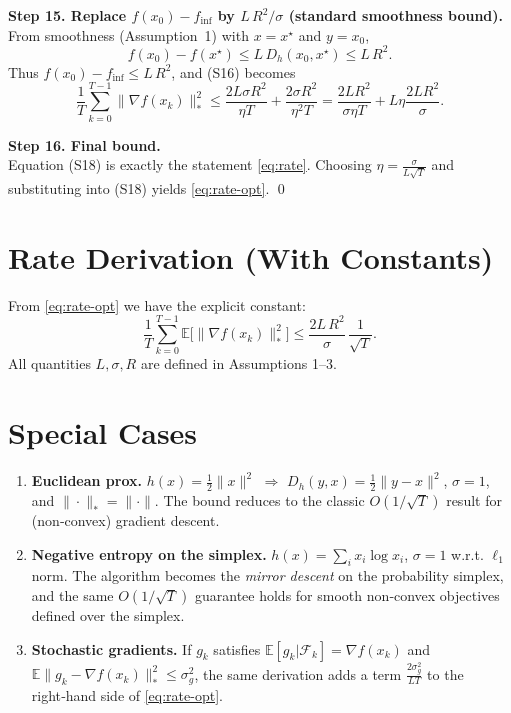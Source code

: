\documentclass{article}
\begin{document}
\noindent\textbf{Step 15. Replace $f(x_0)-f_{\inf}$ by $L\,R^{2}/\sigma$ (standard smoothness bound).}\\
From smoothness (Assumption~1) with $x=x^{\star}$ and $y=x_0$,
\[
f(x_0)-f(x^{\star})\le L\,D_h(x_0,x^{\star})\le L\,R^{2}.
\tag{S17}
\]
Thus $f(x_0)-f_{\inf}\le L\,R^{2}$, and (S16) becomes
\[
\frac{1}{T}\sum_{k=0}^{T-1}\|\nabla f(x_k)\|_{*}^{2}
\le\frac{2L\sigma R^{2}}{\eta T}+\frac{2\sigma R^{2}}{\eta^{2}T}
=\frac{2L R^{2}}{\sigma\eta T}+L\eta\frac{2L R^{2}}{\sigma}.
\tag{S18}
\]

\noindent\textbf{Step 16. Final bound.}\\
Equation (S18) is exactly the statement \eqref{eq:rate}. Choosing
$\displaystyle\eta=\frac{\sigma}{L\sqrt{T}}$ and substituting into (S18) yields \eqref{eq:rate-opt}.
\hfill\qed

\section*{Rate Derivation (With Constants)}
From \eqref{eq:rate-opt} we have the explicit constant:
\[
\boxed{
\frac{1}{T}\sum_{k=0}^{T-1}\mathbb{E}\!\big[\|\nabla f(x_k)\|_{*}^{2}\big]
\le
\frac{2L\,R^{2}}{\sigma}\,\frac{1}{\sqrt{T}} }.
\]
All quantities $L,\sigma,R$ are defined in Assumptions 1–3.

\section*{Special Cases}
\begin{enumerate}
\item \textbf{Euclidean prox.} $h(x)=\frac12\|x\|^{2}$ $\Rightarrow$ $D_h(y,x)=\frac12\|y-x\|^{2}$, $\sigma=1$, and $\|\cdot\|_{*}=\|\cdot\|$. The bound reduces to the classic $O(1/\sqrt{T})$ result for (non‑convex) gradient descent.
\item \textbf{Negative entropy on the simplex.} $h(x)=\sum_{i}x_i\log x_i$, $\sigma=1$ w.r.t. $\ell_1$ norm. The algorithm becomes the \emph{mirror descent} on the probability simplex, and the same $O(1/\sqrt{T})$ guarantee holds for smooth non‑convex objectives defined over the simplex.
\item \textbf{Stochastic gradients.} If $g_k$ satisfies $\mathbb{E}[g_k|\mathcal{F}_k]=\nabla f(x_k)$ and $\mathbb{E}\|g_k-\nabla f(x_k)\|_{*}^{2}\le\sigma_g^{2}$, the same derivation adds a term $ \frac{2\sigma_g^{2}}{L T}$ to the right‑hand side of \eqref{eq:rate-opt}.
\end{enumerate}
\end{document}
